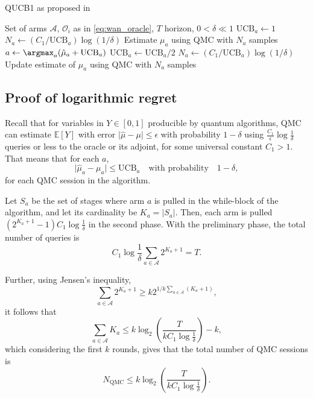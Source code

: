 \begin{algorithm}
    \caption{QUCB1 as proposed in \autocite{wan2022}}
    \label{alg:qucb1}
    \begin{algorithmic}[1]
        \Require Set of arms $\mathcal{A}$, $\mathcal{O}_i$ as in \cref{eq:wan_oracle}, $T$ horizon, $0 < \delta \ll 1$
        \State $\text{UCB}_a \gets 1$
        \State $N_a \gets (C_1/\text{UCB}_a) \log(1/\delta)$
        \State Estimate $\mu_a$ using QMC with $N_a$ samples
        \EndFor
        \State $a \gets \argmax_a (\hat\mu_a + \text{UCB}_a)$
        \State $\text{UCB}_a \gets \text{UCB}_a /2$
        \State $N_a \gets (C_1/\text{UCB}_a) \log(1/\delta)$
        \State Update estimate of $\mu_a$ using QMC with $N_a$ samples
        \EndWhile
    \end{algorithmic}
\end{algorithm}

\subsection{Proof of logarithmic regret}
Recall that for variables in $Y \in [0, 1]$ producible by quantum algorithms, QMC can estimate $\mathbb{E}[Y]$ with error $\lvert\hat{\mu} - \mu\rvert \leq \epsilon$ with probability $1-\delta$ using $\frac{C_1}{\epsilon} \log \frac{1}{\delta}$ queries or less to the oracle or its adjoint, for some universal constant $C_1>1$.
That means that for each $a$,
\begin{equation}
    \lvert\hat{\mu}_a - \mu_a\rvert \leq \text{UCB}_a
    \quad \text{with probability} \quad
    1 - \delta,
    \label{eq:wan_qmc}
\end{equation}
for each QMC session in the algorithm.

Let $S_a$ be the set of stages where arm $a$ is pulled in the while-block of the algorithm, and let its cardinality be $K_a = |S_a|$.
Then, each arm is pulled $(2^{K_a + 1} - 1)C_1 \log \frac1\delta$ in the second phase.
With the preliminary phase, the total number of queries is
\begin{equation}
    C_1 \log \frac{1}{\delta} \sum_{a \in \mathcal{A}} 2^{K_a + 1} = T.
\end{equation}

Further, using Jensen's inequality,
\begin{equation}
    \sum_{a \in \mathcal{A}} 2^{K_a + 1} \geq k 2^{1/k \sum_{a \in \mathcal{A}} (K_a + 1)},
\end{equation}
it follows that
\begin{equation}
    \sum_{a \in \mathcal{A}} K_a
    \leq
    k \log_2 \left(\frac{T}{k C_1 \log \frac{1}{\delta}}\right) -k,
\end{equation}
which considering the first $k$ rounds, gives that the total number of QMC sessions is
\begin{equation}
    N_{\text{QMC}} \leq k \log_2 \left(\frac{T}{k C_1 \log \frac{1}{\delta}}\right).
\end{equation}

